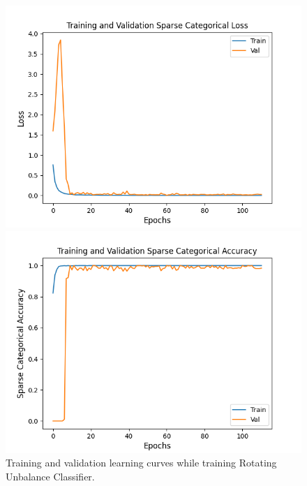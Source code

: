 \documentclass[
  manuscript=report,  %
  layout=preprint,  %
  year=20xx,
  volume=x,
]{extra/joas}
\begin{document}
\begin{figure}[ht!]
  \centering
  \begin{minipage}[b]{0.48\textwidth}
    \includegraphics[width=\textwidth]{figures/trainingAndValidationLoss.png}
    \caption{Training and validation learning curves while training Rotating Unbalance Classifier.}
    \label{fig:trainingAndValidationLossAccuracy}
  \end{minipage}
  \begin{minipage}[b]{0.48\textwidth}
    \includegraphics[width=\textwidth]{figures/trainingAndValidationAccuracy.png}
  \end{minipage} 
\end{figure}
\end{document}
